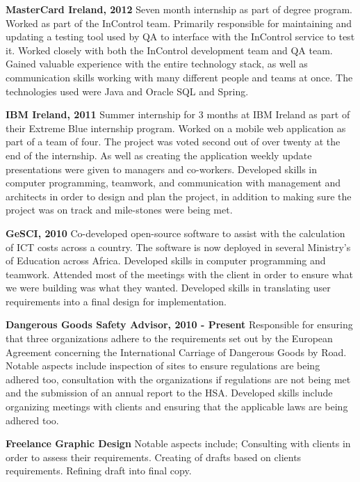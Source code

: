 \documentclass{res}
\begin{document}
\begin{resume}
    {\bf MasterCard Ireland, 2012} Seven month internship as part of degree program. Worked as part of the InControl team. Primarily responsible for maintaining and updating a testing tool used by QA to interface with the InControl service to test it. Worked closely with both the InControl development team and QA team. Gained valuable experience with the entire technology stack, as well as communication skills working with many different people and teams at once. The technologies used were Java and Oracle SQL and Spring.
   
     
    {\bf IBM Ireland, 2011 }Summer internship for 3 months at IBM Ireland as part of their Extreme Blue internship program. Worked on a mobile web application as part of a team of four. The project was voted second out of over twenty at the end of the internship. As well as creating the application weekly update presentations were given to managers and co-workers. Developed skills in computer programming, teamwork, and communication with management and architects in order to design and plan the project, in addition to making sure the project was on track and mile-stones were being met.
    
 
    {\bf GeSCI, 2010} Co-developed open-source software to assist with the calculation of ICT costs across a country. The software is now deployed in several Ministry's of Education across Africa. Developed skills in computer programming and teamwork. Attended most of the meetings with the client in order to ensure what we were building was what they wanted. Developed skills in translating user requirements into a final design for implementation.

    {\bf Dangerous Goods Safety Advisor, 2010 - Present} Responsible for ensuring that three organizations adhere to the requirements set out by the European Agreement concerning the International Carriage of Dangerous Goods by Road. Notable aspects include inspection of sites to ensure regulations are being adhered too, consultation with the organizations if regulations are not being met and the submission of an annual report to the HSA. Developed skills include organizing meetings with clients and ensuring that the applicable laws are being adhered too. 
 
    {\bf Freelance Graphic Design} Notable aspects include; Consulting with clients in order to assess their requirements. Creating of drafts based on clients requirements. Refining draft into final copy.
 
    
 



\end{resume}
\end{document}
